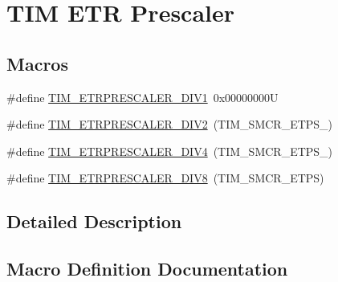 \hypertarget{group___t_i_m___e_t_r___prescaler}{}\section{T\+IM E\+TR Prescaler}
\label{group___t_i_m___e_t_r___prescaler}
\subsection*{Macros}
\begin{DoxyCompactItemize}
\item 
\#define \hyperlink{group___t_i_m___e_t_r___prescaler_gabead5364c62645592e42545ba09ab88a}{T\+I\+M\+\_\+\+E\+T\+R\+P\+R\+E\+S\+C\+A\+L\+E\+R\+\_\+\+D\+I\+V1}~0x00000000U
\item 
\#define \hyperlink{group___t_i_m___e_t_r___prescaler_gaf7fe49f67bdb6b33b9b41953fee75680}{T\+I\+M\+\_\+\+E\+T\+R\+P\+R\+E\+S\+C\+A\+L\+E\+R\+\_\+\+D\+I\+V2}~(T\+I\+M\+\_\+\+S\+M\+C\+R\+\_\+\+E\+T\+P\+S\+\_)
\item 
\#define \hyperlink{group___t_i_m___e_t_r___prescaler_gaa09da30c3cd28f1fe6b6f3f599a5212c}{T\+I\+M\+\_\+\+E\+T\+R\+P\+R\+E\+S\+C\+A\+L\+E\+R\+\_\+\+D\+I\+V4}~(T\+I\+M\+\_\+\+S\+M\+C\+R\+\_\+\+E\+T\+P\+S\+\_)
\item 
\#define \hyperlink{group___t_i_m___e_t_r___prescaler_ga834e38200874cced108379b17a24d0b7}{T\+I\+M\+\_\+\+E\+T\+R\+P\+R\+E\+S\+C\+A\+L\+E\+R\+\_\+\+D\+I\+V8}~(T\+I\+M\+\_\+\+S\+M\+C\+R\+\_\+\+E\+T\+PS)
\end{DoxyCompactItemize}


\subsection{Detailed Description}


\subsection{Macro Definition Documentation}
\mbox{\label{group___t_i_m___e_t_r___prescaler_gabead5364c62645592e42545ba09ab88a}} 
